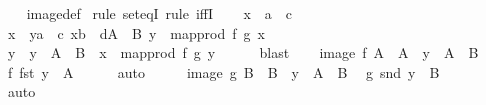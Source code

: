 \begin{isabellebody}
%
\isadelimproof
\ \ %
\endisadelimproof
%
\isatagproof
{}\isamarkupfalse%
\ image{\isacharunderscore}{\kern0pt}def\isanewline
{}\isamarkupfalse%
\ {\isacharparenleft}{\kern0pt}rule\ set{\isacharunderscore}{\kern0pt}eqI{\isacharcomma}{\kern0pt}\ rule\ iffI{\isacharparenright}{\kern0pt}\isanewline
\ \ \isamarkupfalse%
\ x\ {\isacharcolon}{\kern0pt}{\isacharcolon}{\kern0pt}\ {\isachardoublequoteopen}{\isacharprime}{\kern0pt}a\ {\isasymtimes}\ {\isacharprime}{\kern0pt}c{\isachardoublequoteclose}\isanewline
\ \ \isamarkupfalse%
\ {\isachardoublequoteopen}x\ {\isasymin}\ {\isacharbraceleft}{\kern0pt}y{\isacharcolon}{\kern0pt}{\isacharcolon}{\kern0pt}{\isacharprime}{\kern0pt}a\ {\isasymtimes}\ {\isacharprime}{\kern0pt}c{\isachardot}{\kern0pt}\ {\isasymexists}x{\isacharcolon}{\kern0pt}{\isacharcolon}{\kern0pt}{\isacharprime}{\kern0pt}b\ {\isasymtimes}\ {\isacharprime}{\kern0pt}d{\isasymin}A\ {\isasymtimes}\ B{\isachardot}{\kern0pt}\ y\ {\isacharequal}{\kern0pt}\ map{\isacharunderscore}{\kern0pt}prod\ f\ g\ x{\isacharbraceright}{\kern0pt}{\isachardoublequoteclose}\isanewline
\ \ \isamarkupfalse%
\ \isamarkupfalse%
\ y\ \ {\isachardoublequoteopen}y\ {\isasymin}\ A\ {\isasymtimes}\ B{\isachardoublequoteclose}\ \ {\isachardoublequoteopen}x\ {\isacharequal}{\kern0pt}\ map{\isacharunderscore}{\kern0pt}prod\ f\ g\ y{\isachardoublequoteclose}\isanewline
\ \ \ \ \isamarkupfalse%
\ blast\isanewline
\ \ \isamarkupfalse%
\ {\isacartoucheopen}image\ f\ A\ {\isacharequal}{\kern0pt}\ A{\isacharprime}{\kern0pt}{\isacartoucheclose}\ \ {\isacartoucheopen}y\ {\isasymin}\ A\ {\isasymtimes}\ B{\isacartoucheclose}\ \isamarkupfalse%
\ {\isachardoublequoteopen}f\ {\isacharparenleft}{\kern0pt}fst\ y{\isacharparenright}{\kern0pt}\ {\isasymin}\ A{\isacharprime}{\kern0pt}{\isachardoublequoteclose}\isanewline
\ \ \ \ \isamarkupfalse%
\ auto\isanewline
\ \ \isamarkupfalse%
\ \isamarkupfalse%
\ {\isacartoucheopen}image\ g\ B\ {\isacharequal}{\kern0pt}\ B{\isacharprime}{\kern0pt}{\isacartoucheclose}\ \ {\isacartoucheopen}y\ {\isasymin}\ A\ {\isasymtimes}\ B{\isacartoucheclose}\ \isamarkupfalse%
\ {\isachardoublequoteopen}g\ {\isacharparenleft}{\kern0pt}snd\ y{\isacharparenright}{\kern0pt}\ {\isasymin}\ B{\isacharprime}{\kern0pt}{\isachardoublequoteclose}\isanewline
\ \ \ \ \isamarkupfalse%
\ auto\isanewline

\end{isabellebody}
